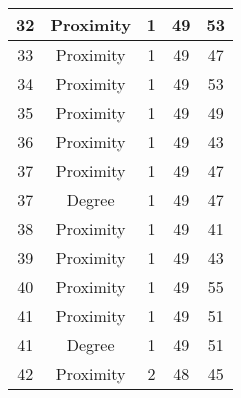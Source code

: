 \documentclass[results.tex]{subfiles}
\begin{document}
\begin{center}
\begin{tabular}{| c || c | c | c | c |}
            \hline
            32                      & Proximity                    & 1                      & 49                      & 53                   \\
            \hline
            33                      & Proximity                    & 1                      & 49                      & 47                   \\
            \hline
            34                      & Proximity                    & 1                      & 49                      & 53                   \\
            \hline
            35                      & Proximity                    & 1                      & 49                      & 49                   \\
            \hline
            36                      & Proximity                    & 1                      & 49                      & 43                   \\
            \hline
            37                      & Proximity                    & 1                      & 49                      & 47                   \\
            \hline
            37                      & Degree                       & 1                      & 49                      & 47                   \\
            \hline
            38                      & Proximity                    & 1                      & 49                      & 41                   \\
            \hline
            39                      & Proximity                    & 1                      & 49                      & 43                   \\
            \hline
            40                      & Proximity                    & 1                      & 49                      & 55                   \\
            \hline
            41                      & Proximity                    & 1                      & 49                      & 51                   \\
            \hline
            41                      & Degree                       & 1                      & 49                      & 51                   \\
            \hline
            42                      & Proximity                    & 2                      & 48                      & 45                   \\

\end{tabular}
\end{center}
\end{document}
